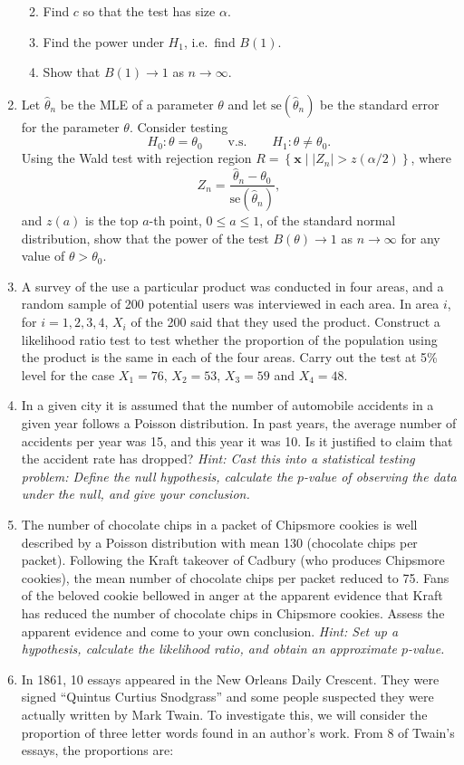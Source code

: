\documentclass[
]{book}
\providecommand{\tightlist}{%
  \setlength{\itemsep}{0pt}\setlength{\parskip}{0pt}}
\newcommand{\bx}{{\boldsymbol x}}
\theoremstyle{definition}
\theoremstyle{definition}
\theoremstyle{definition}
\theoremstyle{definition}
\theoremstyle{remark}
\begin{document}
\begin{enumerate}
  \begin{enumerate}
  \def\labelenumii{(\alph{enumii})}
  \tightlist
  \item
    Find \(c\) so that the test has size \(\alpha\).
  \item
    Find the power under \(H_1\), i.e.~find \(B(1)\).
  \item
    Show that \(B(1)\to 1\) as \(n\to \infty\).
  \end{enumerate}
\item
  Let \(\hat\theta_n\) be the MLE of a parameter \(\theta\) and let \(\text{se}(\hat\theta_n)\) be the standard error for the parameter \(\theta\). Consider testing
  \[
  H_0: \theta = \theta_0 \hspace{2em}\text{v.s.}\hspace{2em} H_1:\theta \neq\theta_0.
  \]
  Using the Wald test with rejection region \(R= \left\{ \bx \mid |Z_n| > z(\alpha/2) \right\}\), where
  \[
  Z_n = \frac{\hat\theta_n - \theta_0}{\text{se}(\hat\theta_n)},
  \]
  and \(z(a)\) is the top \(a\)-th point, \(0\leq a\leq 1\), of the standard normal distribution, show that the power of the test \(B(\theta)\to 1\) as \(n\to\infty\) for any value of \(\theta>\theta_0\).
\item
  A survey of the use a particular product was conducted in four areas, and a random sample of 200 potential users was interviewed in each area. In area \(i\), for \(i = 1, 2, 3, 4\), \(X_i\) of the 200 said that they used the product. Construct a likelihood ratio test to test whether the proportion of the population using the product is the same in each of the four areas. Carry out the test at 5\% level for the case \(X_1 = 76\), \(X_2 = 53\), \(X_3 = 59\) and \(X_4 = 48\).
\item
  In a given city it is assumed that the number of automobile accidents in a given year follows a Poisson distribution. In past years, the average number of accidents per year was 15, and this year it was 10. Is it justified to claim that the accident rate has dropped? \emph{Hint: Cast this into a statistical testing problem: Define the null hypothesis, calculate the \(p\)-value of observing the data under the null, and give your conclusion.}
\item
  The number of chocolate chips in a packet of Chipsmore cookies is well described by a Poisson distribution with mean 130 (chocolate chips per packet). Following the Kraft takeover of Cadbury (who produces Chipsmore cookies), the mean number of chocolate chips per packet reduced to 75. Fans of the beloved cookie bellowed in anger at the apparent evidence that Kraft has reduced the number of chocolate chips in Chipsmore cookies. Assess the apparent evidence and come to your own conclusion. \emph{Hint: Set up a hypothesis, calculate the likelihood ratio, and obtain an approximate \(p\)-value.}
\item
  In 1861, 10 essays appeared in the New Orleans Daily Crescent. They were signed ``Quintus Curtius Snodgrass'' and some people suspected they were actually written by Mark Twain. To investigate this, we will consider the proportion of three letter words found in an author's work. From 8 of Twain's essays, the proportions are:


\end{enumerate}
\end{document}
